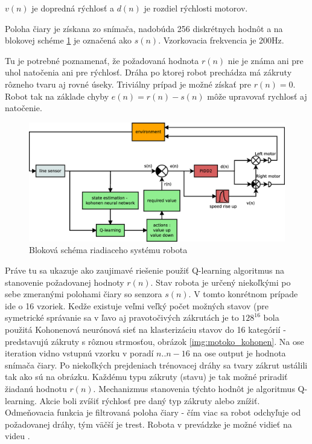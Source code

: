 $v(n)$ je dopredná rýchlosť a $d(n)$ je rozdiel rýchlosti motorov.

Poloha čiary je získana zo snímača, nadobúda 256 diskrétnych hodnôt a na blokovej schéme \ref{img:motoko_block} je
označená ako $s(n)$. Vzorkovacia frekvencia je 200Hz.

Tu je potrebné poznamenať, že požadovaná hodnota $r(n)$ nie je známa ani pre uhol natočenia ani pre rýchlosť.
Dráha po ktorej robot prechádza má zákruty rôzneho tvaru aj rovné úseky.
Triviálny prípad je možné získať pre $r(n) = 0$. Robot tak na základe chyby $e(n) = r(n) - s(n)$
môže upravovať rychlosť aj natočenie.

\begin{figure}[!htb]
\center
\includegraphics[scale=.3]{../diagrams/motoko_robot_block.eps}
\caption{Bloková schéma riadiaceho systému robota}
\label{img:motoko_block}
\end{figure}

Práve tu sa ukazuje ako zaujimavé riešenie použiť Q-learning algoritmus na stanovenie
požadovanej hodnoty $r(n)$. Stav robota je určený niekoľkými po sebe zmeranými polohami čiary so senzora
$s(n)$. V tomto konrétnom prípade ide o 16 vzoriek.
Kedže existuje veľmi veľký počet možných stavov (pre symetrické správanie sa
v ľavo aj pravotočivých zákrutách je to $128^{16}$ bola použitá Kohonenová neurónová
sieť na klasterizáciu stavov do 16 kategórií - predstavujú zákruty s rôznou strmosťou, obrázok
\ref{img:motoko_kohonen}. Na ose iteration vidno vstupnú vzorku v poradí $n..n-16$
na ose output je hodnota snímača čiary. Po niekoľkých prejdeniach trénovacej dráhy
sa tvary zákrut ustálili tak ako sú na obrázku. Každému typu zákruty (stavu) je tak
možné priradiť žiadanú hodnotu $r(n)$. Mechanizmus stanovenia týchto hodnôt je algoritmus
Q-learning. Akcie boli zvíšiť rýchlosť pre daný typ zákruty alebo znížiť. Odmeňovacia funkcia
je filtrovaná poloha čiary - čím viac sa robot odchyľuje od požadovanej dráhy, tým väčší je trest.
Robota v prevádzke je možné vidieť na videu \cite{bib:mototko_video}.

